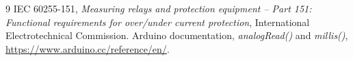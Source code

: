 \documentclass[12pt, a4paper]{article}
\begin{document}
\begin{thebibliography}{9}
 IEC 60255-151, \emph{Measuring relays and protection equipment -- Part 151: Functional requirements for over/under current protection}, International Electrotechnical Commission.
 Arduino documentation, \emph{analogRead()} and \emph{millis()}, \url{https://www.arduino.cc/reference/en/}.
\end{thebibliography}
\end{document}
